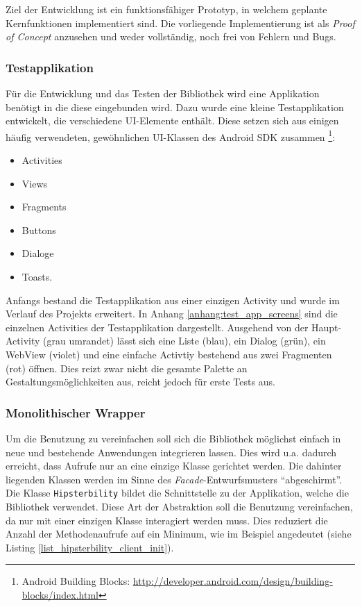 Ziel der Entwicklung ist ein funktionsfähiger Prototyp, in welchem geplante Kernfunktionen implementiert sind.
Die vorliegende Implementierung ist als \emph{Proof of Concept} anzusehen und weder vollständig, noch frei von Fehlern und Bugs.

\subsubsection{Testapplikation}
Für die Entwicklung und das Testen der Bibliothek wird eine Applikation benötigt in die diese eingebunden wird.
Dazu wurde eine kleine Testapplikation entwickelt, die verschiedene \ac{UI}-Elemente enthält.
Diese setzen sich aus einigen häufig verwendeten, gewöhnlichen \ac{UI}-Klassen des Android SDK zusammen \footnote{Android Building Blocks: \url{http://developer.android.com/design/building-blocks/index.html}}:
\begin{itemize}
	\item Activities
	\item Views
	\item Fragments
	\item Buttons
	\item Dialoge
	\item Toasts.
\end{itemize}
Anfangs bestand die Testapplikation aus einer einzigen Activity und wurde im Verlauf des Projekts erweitert.
In Anhang \ref{anhang:test_app_screens} sind die einzelnen Activities der Testapplikation dargestellt.
Ausgehend von der Haupt-Activity (grau umrandet) lässt sich eine Liste (blau), ein Dialog (grün), ein WebView (violet) und eine einfache Activtiy bestehend aus zwei Fragmenten (rot) öffnen.
Dies reizt zwar nicht die gesamte Palette an Gestaltungsmöglichkeiten aus, reicht jedoch für erste Tests aus.

\subsubsection{Monolithischer Wrapper\label{sec:monolithischer_wrapper}}
Um die Benutzung zu vereinfachen soll sich die Bibliothek möglichst einfach in neue und bestehende Anwendungen integrieren lassen.
Dies wird u.a. dadurch erreicht, dass Aufrufe nur an eine einzige Klasse gerichtet werden.
Die dahinter liegenden Klassen werden im Sinne des \emph{Facade}-Entwurfsmusters \cite[vgl.][40\psq]{designpattern} \enquote{abgeschirmt}.
Die Klasse \texttt{Hipsterbility} bildet die Schnittstelle zu der Applikation, welche die Bibliothek verwendet.
Diese Art der Abstraktion soll die Benutzung vereinfachen, da nur mit einer einzigen Klasse interagiert werden muss. 
Dies reduziert die Anzahl der Methodenaufrufe auf ein Minimum, wie im Beispiel angedeutet (siehe Listing \ref{list_hipsterbility_client_init}).

